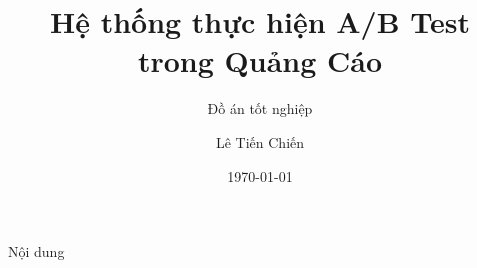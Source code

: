 \documentclass{beamer}
\title{Hệ thống thực hiện A/B Test trong Quảng Cáo}
\subtitle{Đồ án tốt nghiệp}
\author{Lê Tiến Chiến}
\institute{Ngành: Khoa học máy tính}
\date{\today}
\begin{document}
\titlepage

\begin{frame}{Nội dung}
	\tableofcontents
\end{frame}






\end{document}
